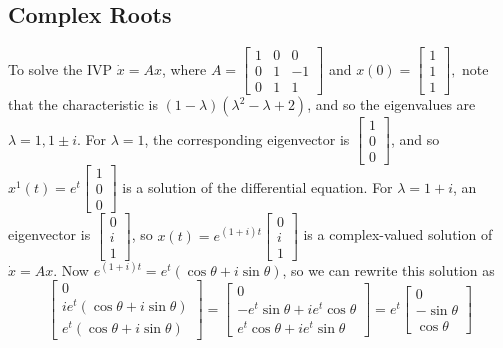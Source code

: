 \subsection{Complex Roots}
\begin{example}
To solve the IVP $\dot x=Ax$, where $A=
\begin{bmatrix}
    1 & 0 & 0\\
    0 & 1 & -1 \\
    0 & 1 & 1 
\end{bmatrix}$ and $x(0)=
\begin{bmatrix}
    1\\1\\1
\end{bmatrix},$ note that the characteristic is $(1-\lambda)(\lambda^2-\lambda+2)$, and so the eigenvalues are $\lambda=1,1\pm i$. For $\lambda=1$, the corresponding eigenvector is $
\begin{bmatrix}
    1\\0\\0
\end{bmatrix}$, and so $x^1(t)=e^{t}
\begin{bmatrix}
    1\\0\\0
\end{bmatrix}$ is a solution of the differential equation. For $\lambda=1+i$, an eigenvector is $
\begin{bmatrix}
    0\\i\\1
\end{bmatrix}$, so $x(t)=e^{(1+i)t}
\begin{bmatrix}
    0\\i\\1
\end{bmatrix}$ is a complex-valued solution of $\dot x=Ax.$ Now $e^{(1+i)t}=e^{t}\left( \cos\theta+i\sin\theta \right) $, so we can rewrite this solution as \[
\begin{bmatrix}
    0\\ie^{t}(\cos\theta+i\sin\theta)\\e^{t}(\cos\theta+i\sin\theta)
\end{bmatrix}=
\begin{bmatrix}
    0\\-e^{t}\sin\theta+ie^{t}\cos\theta\\e^{t}\cos\theta+ie^{t}\sin\theta
\end{bmatrix}=e^{t}
\begin{bmatrix}
    0\\-\sin\theta\\ \cos\theta

\end{bmatrix}\]
\end{example}

